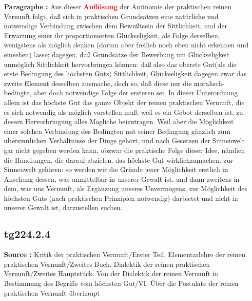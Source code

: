 \documentclass[a4paper,12pt,twoside]{book}
\newcommand{\match}[1]{\textcolor{red}{\textbf{#1}}}
\begin{document}
	\noindent\textbf{Paragraphe : }Aus dieser \match{Auflösung} der Antinomie der praktischen reinen Vernunft folgt, daß sich in praktischen Grundsätzen eine natürliche und notwendige Verbindung zwischen dem Bewußtsein der Sittlichkeit, und der Erwartung einer ihr proportionierten Glückseligkeit, als Folge derselben, wenigstens als möglich denken (darum aber freilich noch eben nicht erkennen und einsehen) lasse; dagegen, daß Grundsätze der Bewerbung um Glückseligkeit unmöglich Sittlichkeit hervorbringen können: daß also das oberste Gut(als die erste Bedingung des höchsten Guts) Sittlichkeit, Glückseligkeit dagegen zwar das zweite Element desselben ausmache, doch so, daß diese nur die moralisch-bedingte, aber doch notwendige Folge der ersteren sei. In dieser Unterordnung allein ist das höchste Gut das ganze Objekt der reinen praktischen Vernunft, die es sich notwendig als möglich vorstellen muß, weil es ein Gebot derselben ist, zu dessen Hervorbringung alles Mögliche beizutragen. Weil aber die Möglichkeit einer solchen Verbindung des Bedingten mit seiner Bedingung gänzlich zum übersinnlichen Verhältnisse der Dinge gehört, und nach Gesetzen der Sinnenwelt gar nicht gegeben werden kann, obzwar die praktische Folge dieser Idee, nämlich die Handlungen, die darauf abzielen. das höchste Gut wirklichzumachen, zur Sinnenwelt gehören: so werden wir die Gründe jener Möglichkeit erstlich in Ansehung dessen, was unmittelbar in unserer Gewalt ist, und dann zweitens in dem, was uns Vernunft, als Ergänzung unseres Unvermögens, zur Möglichkeit des höchsten Guts (nach praktischen Prinzipien notwendig) darbietet und nicht in unserer Gewalt ist, darzustellen suchen. 
	
	\subsection*{tg224.2.4} 
	\textbf{Source : }Kritik der praktischen Vernunft/Erster Teil. Elementarlehre der reinen praktischen Vernunft/Zweites Buch. Dialektik der reinen praktischen Vernunft/Zweites Hauptstück. Von der Dialektik der reinen Vernunft in Bestimmung des Begriffs vom höchsten Gut/VI. Über die Postulate der reinen praktischen Vernunft überhaupt\\  
	
\end{document}
